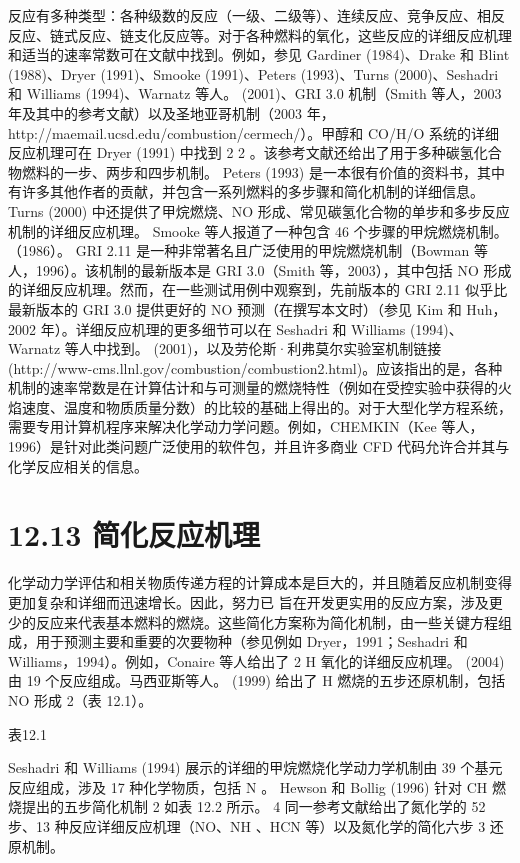 \documentclass[11pt,a4paper,openany,fontset=none]{ctexbook}
\begin{document}
反应有多种类型：各种级数的反应（一级、二级等）、连续反应、竞争反应、相反反应、链式反应、链支化反应等。对于各种燃料的氧化，这些反应的详细反应机理和适当的速率常数可在文献中找到。例如，参见 Gardiner (1984)、Drake 和 Blint (1988)、Dryer (1991)、Smooke (1991)、Peters (1993)、Turns (2000)、Seshadri 和 Williams (1994)、Warnatz 等人。 (2001)、GRI 3.0 机制（Smith 等人，2003 年及其中的参考文献）以及圣地亚哥机制（2003 年，http://maemail.ucsd.edu/combustion/cermech/）。甲醇和 CO/H/O 系统的详细反应机理可在 Dryer (1991) 中找到 2 2 。该参考文献还给出了用于多种碳氢化合物燃料的一步、两步和四步机制。 Peters (1993) 是一本很有价值的资料书，其中有许多其他作者的贡献，并包含一系列燃料的多步骤和简化机制的详细信息。 Turns (2000) 中还提供了甲烷燃烧、NO 形成、常见碳氢化合物的单步和多步反应机制的详细反应机理。 Smooke 等人报道了一种包含 46 个步骤的甲烷燃烧机制。 （1986）。 GRI 2.11 是一种非常著名且广泛使用的甲烷燃烧机制（Bowman 等人，1996）。该机制的最新版本是 GRI 3.0（Smith 等，2003），其中包括 NO 形成的详细反应机理。然而，在一些测试用例中观察到，先前版本的 GRI 2.11 似乎比最新版本的 GRI 3.0 提供更好的 NO 预测（在撰写本文时）（参见 Kim 和 Huh，2002 年）。详细反应机理的更多细节可以在 Seshadri 和 Williams (1994)、Warnatz 等人中找到。 (2001)，以及劳伦斯·利弗莫尔实验室机制链接 (http://www-cms.llnl.gov/combustion/combustion2.html)。应该指出的是，各种机制的速率常数是在计算估计和与可测量的燃烧特性（例如在受控实验中获得的火焰速度、温度和物质质量分数）的比较的基础上得出的。对于大型化学方程系统，需要专用计算机程序来解决化学动力学问题。例如，CHEMKIN（Kee 等人，1996）是针对此类问题广泛使用的软件包，并且许多商业 CFD 代码允许合并其与化学反应相关的信息。

\section*{12.13 简化反应机理}

化学动力学评估和相关物质传递方程的计算成本是巨大的，并且随着反应机制变得更加复杂和详细而迅速增长。因此，努力已
旨在开发更实用的反应方案，涉及更少的反应来代表基本燃料的燃烧。这些简化方案称为简化机制，由一些关键方程组成，用于预测主要和重要的次要物种（参见例如 Dryer，1991；Seshadri 和 Williams，1994）。例如，Conaire 等人给出了 2 H 氧化的详细反应机理。 (2004) 由 19 个反应组成。马西亚斯等人。 (1999) 给出了 H 燃烧的五步还原机制，包括 NO 形成 2（表 12.1）。

表12.1

Seshadri 和 Williams (1994) 展示的详细的甲烷燃烧化学动力学机制由 39 个基元反应组成，涉及 17 种化学物质，包括 N 。 Hewson 和 Bollig (1996) 针对 CH 燃烧提出的五步简化机制 2 如表 12.2 所示。 4 同一参考文献给出了氮化学的 52 步、13 种反应详细反应机理（NO、NH 、HCN 等）以及氮化学的简化六步 3 还原机制。
\end{document}
